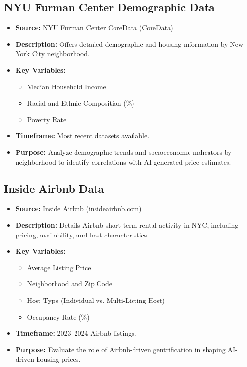 \documentclass{article}
\begin{document}
\subsection{NYU Furman Center Demographic Data}
\begin{itemize}
    \item \textbf{Source:} NYU Furman Center CoreData (\href{hhttp://furmancenter.org/coredata}{CoreData})
    \item \textbf{Description:} Offers detailed demographic and housing information by New York City neighborhood.
    \item \textbf{Key Variables:}
    \begin{itemize}
        \item Median Household Income
        \item Racial and Ethnic Composition (\%)
        \item Poverty Rate
    \end{itemize}
    \item \textbf{Timeframe:} Most recent datasets available.
    \item \textbf{Purpose:} Analyze demographic trends and socioeconomic indicators by neighborhood to identify correlations with AI-generated price estimates.
\end{itemize}

\subsection{Inside Airbnb Data}
\begin{itemize}
    \item \textbf{Source:} Inside Airbnb (\href{http://insideairbnb.com/get-the-data.html}{insideairbnb.com})
    \item \textbf{Description:} Details Airbnb short-term rental activity in NYC, including pricing, availability, and host characteristics.
    \item \textbf{Key Variables:}
    \begin{itemize}
        \item Average Listing Price
        \item Neighborhood and Zip Code
        \item Host Type (Individual vs. Multi-Listing Host)
        \item Occupancy Rate (\%)
    \end{itemize}
    \item \textbf{Timeframe:} 2023–2024 Airbnb listings.
    \item \textbf{Purpose:} Evaluate the role of Airbnb-driven gentrification in shaping AI-driven housing prices.
\end{itemize}
\end{document}
